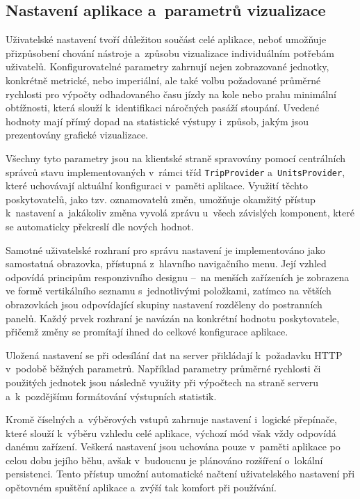 \subsection{Nastavení aplikace a~parametrů vizualizace}
\label{setting-application-and-visualization-parameters}

Uživatelské nastavení tvoří důležitou součást celé aplikace, neboť umožňuje přizpůsobení chování nástroje a~způsobu vizualizace individuálním potřebám uživatelů.
Konfigurovatelné parametry zahrnují nejen zobrazované jednotky, konkrétně metrické, nebo imperiální, ale také volbu požadované průměrné rychlosti pro výpočty odhadovaného času jízdy na kole nebo prahu minimální obtížnosti, která slouží k~identifikaci náročných pasáží stoupání.
Uvedené hodnoty mají přímý dopad na statistické výstupy i~způsob, jakým jsou prezentovány grafické vizualizace.

Všechny tyto parametry jsou na klientské straně spravovány pomocí centrálních správců stavu implementovaných v~rámci tříd \texttt{TripProvider} a~\texttt{UnitsProvider}, které uchovávají aktuální konfiguraci v~paměti aplikace.
Využití těchto poskytovatelů, jako tzv. oznamovatelů změn, umožňuje okamžitý přístup k~nastavení a~jakákoliv změna vyvolá zprávu u~všech závislých komponent, které se automaticky překreslí dle nových hodnot.

Samotné uživatelské rozhraní pro správu nastavení je implementováno jako samostatná obrazovka, přístupná z~hlavního navigačního menu.
Její vzhled odpovídá principům responzivního designu --~na menších zařízeních je zobrazena ve formě vertikálního seznamu s~jednotlivými položkami, zatímco na větších obrazovkách jsou odpovídající skupiny nastavení rozděleny do postranních panelů.
Každý prvek rozhraní je navázán na konkrétní hodnotu poskytovatele, přičemž změny se promítají ihned do celkové konfigurace aplikace.

Uložená nastavení se při odesílání dat na server přikládají k~požadavku HTTP v~podobě běžných parametrů.
Například parametry průměrné rychlosti či použitých jednotek jsou následně využity při výpočtech na straně serveru a~k~pozdějšímu formátování výstupních statistik.

Kromě číselných a~výběrových vstupů zahrnuje nastavení i~logické přepínače, které slouží k~výběru vzhledu celé aplikace, výchozí mód však vždy odpovídá danému zařízení.
Veškerá nastavení jsou uchována pouze v~paměti aplikace po celou dobu jejího běhu, avšak v~budoucnu je plánováno rozšíření o~lokální persistenci.
Tento přístup umožní automatické načtení uživatelského nastavení při opětovném spuštění aplikace a~zvýší tak komfort při používání.


